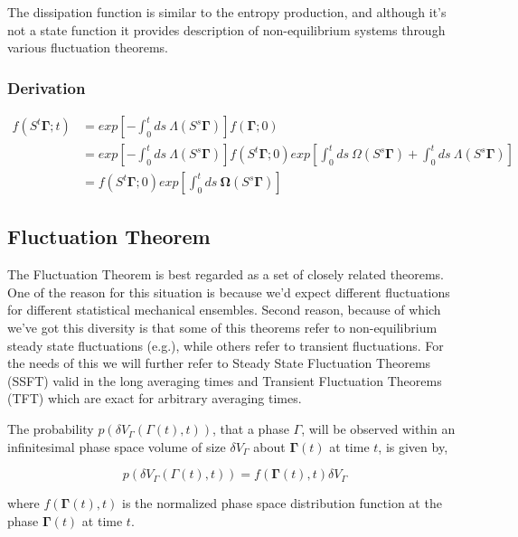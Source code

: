 \documentclass[a4paper,12pt,nofootinbib]{article}
\begin{document}
The dissipation function is similar to the entropy production, and although it's not a state function it provides description of non-equilibrium systems through various fluctuation theorems.

\subsubsection{Derivation}


\begin{equation}
\begin{aligned}
  f(S^t\bm{\Gamma};t) &= exp[-\int_0^t ds\ \Lambda(S^s\bm{\Gamma})]f(\bm{\Gamma};0)\\
  &=exp[-\int_0^t ds\ \Lambda(S^s\bm{\Gamma})]f(S^t \bm{\Gamma};0) exp[\int_0^t ds\ \Omega(S^s \bm{\Gamma}) + \int_0^t ds\ \Lambda(S^s\bm{\Gamma})]\\
  &=f(S^t \bm{\Gamma};0) exp[\int_0^t ds\ \bm{\Omega}(S^s \bm{\Gamma})]
\end{aligned}
\end{equation}


\subsection{Fluctuation Theorem}
The Fluctuation Theorem is best regarded as a set of closely related theorems.
One of the reason for this situation is because we'd expect different fluctuations for different statistical mechanical ensembles.
Second reason, because of which we've got this diversity is that some of this theorems refer to non-equilibrium steady state fluctuations (e.g.), while others refer to transient fluctuations.
For the needs of this we will further refer to Steady State Fluctuation Theorems (SSFT) valid in the long averaging times and Transient Fluctuation Theorems (TFT) which are exact for arbitrary averaging times.

The probability $p(\delta V_{\Gamma}(\Gamma(t),t))$, that a phase $\Gamma$, will be observed within an infinitesimal phase space volume of size $\delta V_{\Gamma}$ about $\bm{\Gamma}(t)$ at time $t$, is given by,

\begin{equation}
  p(\delta V_{\Gamma}(\Gamma(t),t)) = f(\bm{\Gamma}(t),t)\delta V_{\Gamma}
\end{equation}

where $f(\bm{\Gamma}(t),t)$ is the normalized phase space distribution function at the phase $\bm{\Gamma}(t)$ at time $t$.
\end{document}
